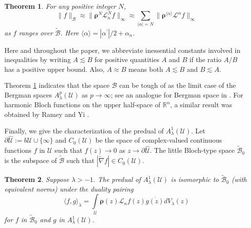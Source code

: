 \documentclass{amsart}
\newtheorem{theorem}{Theorem}[section]
\numberwithin{equation}{section}
\newcommand{\bfL}{\mathcal{L}}
\newcommand{\calL}{\mathcal{L}}
\newcommand{\calU}{\mathcal{U}}
\newcommand{\bfi}{\mathbf{i}}
\newcommand{\bfrho}{\boldsymbol{\rho}}
\newcommand{\calB}{\mathcal{B}}
\begin{document}
\begin{theorem}\label{thm:bloch norm equiv}
For any positive integer $N$,
\[
\|f\|_{\calB} \approx \|\bfrho^N \bfL_n^N f\|_{\infty} \approx \sum_{|\alpha | = N} \| \bfrho^{\langle \alpha \rangle} \bfL^{\alpha} f\|_{\infty}
\]
as $f$ ranges over $\widetilde{\calB}$. Here $\langle \alpha \rangle=|\alpha^{\prime}|/2+\alpha_n$. 
\end{theorem}

Here and throughout the paper, we abbreviate inessential constants involved in inequalities by writing $A\lesssim B$ for positive quantities $A$ and $B$ if the ratio $A/B$ has a positive upper bound. Also, $A\approx B$ means both $A\lesssim B$ and $B\lesssim A$.

Theorem \ref{thm:bloch norm equiv} indicates that the space $\calB$ can be tough of as the limit case of the Bergman spaces $A_{\lambda}^p(\calU)$ as $p\to\infty$; 
see an analogue for Bergman space in \cite[Theorem 1.4]{LSX22}. 
For  harmonic Bloch functions on the upper half-space of $\mathbb{R}^n$, a similar result was obtained by Ramey and Yi \cite[Theorem 5.13]{RY96}. 

Finally, we give the characterization of the predual of $A_\lambda^1(\calU)$.
Let $\partial \widehat{\calU}:=b\calU\cup\{\infty\}$ and $C_0(\calU)$ be the space of complex-valued continuous functions $f$ in $\calU$ such that $f(z)\to 0$ as $z\to\partial \widehat{\calU}$. 
The little Bloch-type space $\widetilde{\calB}_0$ is the subspace of $\widetilde{\calB}$ such that $|\widetilde{\nabla}f|\in C_0(\calU)$. 





\begin{theorem}\label{thm:predual}
Suppose $\lambda>-1$. The predual of $A_\lambda^1(\calU)$ is isomorphic to $\widetilde{\calB}_0$ (with equivalent norms) under the duality pairing
\[
\langle f,g \rangle_\lambda = \int\limits_{\calU} \bfrho(z) \calL_n f(z) \overline{g(z)}  dV_\lambda(z)
\]
for $f$ in $\widetilde{\calB}_0$ and $g$ in $A_\lambda^1(\calU)$.
\end{theorem}
\end{document}
